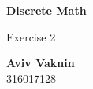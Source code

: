 \documentclass[a4paper, 12pt]{article}
\begin{document}
    \begin{center}
        \vspace*{4.4cm}
            
        \Huge
        \textbf{Discrete Math}
            
        \vspace{0.5cm}
        \LARGE
        Exercise 2

        \vfill
            
        \Large
        \textbf{Aviv Vaknin}\\316017128
                    
    \end{center}
\end{document}
